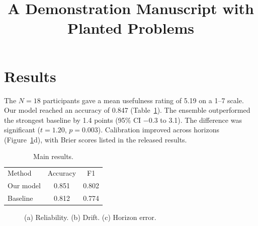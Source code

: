 \documentclass{article}
\begin{document}
\title{A Demonstration Manuscript with Planted Problems}
\maketitle

\section{Results}
The $N=18$ participants gave a mean usefulness rating of 5.19 on a 1--7 scale.
Our model reached an accuracy of 0.847 (Table~\ref{tab:main}).
The ensemble outperformed the strongest baseline by 1.4 points (95\% CI $-0.3$ to 3.1).
The difference was significant ($t = 1.20$, $p = 0.003$).
Calibration improved across horizons (Figure~\ref{fig:cal}d), with Brier scores listed in the released results.

\begin{table}[h]
\caption{Main results.}\label{tab:main}
\begin{tabular}{lcc}
Method & Accuracy & F1 \\
Our model & 0.851 & 0.802 \\
Baseline & 0.812 & 0.774 \\
\end{tabular}
\end{table}

\begin{figure}[h]
\caption{(a) Reliability. (b) Drift. (c) Horizon error.}\label{fig:cal}
\end{figure}
\end{document}
